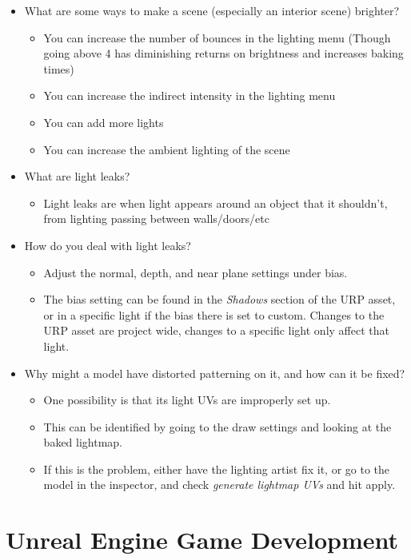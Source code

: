 \documentclass{article}
\begin{document}
\begin{itemize}
\begin{itemize}
    \end{itemize}
    \item What are some ways to make a scene (especially an interior scene) brighter?
    \begin{itemize}
        \item You can increase the number of bounces in the lighting menu (Though going above 4 has diminishing returns on brightness and increases baking times)
        \item You can increase the indirect intensity in the lighting menu
        \item You can add more lights
        \item You can increase the ambient lighting of the scene
    \end{itemize}
    \item What are light leaks?
    \begin{itemize}
        \item Light leaks are when light appears around an object that it shouldn't, from lighting passing between walls/doors/etc
    \end{itemize}
    \item How do you deal with light leaks?
    \begin{itemize}
        \item Adjust the normal, depth, and near plane settings under bias.
        \item The bias setting can be found in the \textit{Shadows} section of the URP asset, or in a specific light if the bias there is set to custom. Changes to the URP asset are project wide, changes to a specific light only affect that light.
    \end{itemize}
    \item Why might a model have distorted patterning on it, and how can it be fixed?
    \begin{itemize}
        \item One possibility is that its light UVs are improperly set up.
        \item This can be identified by going to the draw settings and looking at the baked lightmap. 
        \item If this is the problem, either have the lighting artist fix it, or go to the model in the inspector, and check \textit{generate lightmap UVs} and hit apply.
    \end{itemize}
\end{itemize}

\newpage
\section{Unreal Engine Game Development}
\end{document}
